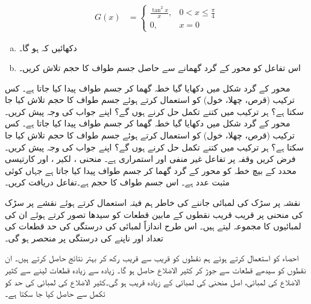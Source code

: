 \begin{align*}
G(x)&=\begin{cases}
\frac{\tan^2 x}{x},& 0<x\le \frac{\pi}{4}\\
0,& x=0
\end{cases}
\end{align*}
\begin{enumerate}[a.]
\item
دکھائیں کہ  ہو گا۔
\item
اس تفاعل کو محور  کے گرد گھمانے سے حاصل جسم طواف کا حجم تلاش کریں۔
\end{enumerate}
محور  کے گرد شکل  میں دکھایا گیا خطہ گھما کر جسم طواف پیدا کیا جاتا ہے۔ کس ترکیب (قرص، چھلا، خول) کو استعمال کرتے ہوئے جسم طواف کا حجم تلاش کیا جا سکتا ہے؟ ہر ترکیب میں کتنے تکمل حل کرنے ہوں گے؟
 اپنے جواب کی وجہ پیش کریں۔
محور  کے گرد شکل  میں دکھایا گیا خطہ گھما کر جسم طواف پیدا کیا جاتا ہے۔ کس ترکیب (قرص، چھلا، خول) کو استعمال کرتے ہوئے جسم طواف کا حجم تلاش کیا جا سکتا ہے؟ ہر ترکیب میں کتنے تکمل حل کرنے ہوں گے؟ اپنے جواب کی وجہ پیش کریں۔
فرض کریں وقفہ  پر  تفاعل  غیر منفی اور استمراری ہے۔ منحنی ، لکیر ، اور کارتیسی محدد کے بیچ خطہ کو محور  کے گرد گھما کر جسم طواف پیدا کیا جاتا ہے جہاں  کوئی مثبت عدد ہے۔ اس جسم طواف کا حجم  ہے۔تفاعل  دریافت کریں۔




نقشہ پر سڑک کی لمبائی جاننے کی خاطر ہم فیتہ استعمال کرتے ہوئے نقشے  پر سڑک کی منحنی پر قریب قریب نقطوں کے مابین قطعات کو سیدھا تصور کرتے ہوئے ان کی لمبائیوں کا مجموعہ لیتے ہیں۔ اس طرح اندازاً لمبائی کی درستگی کی حد قطعات کی تعداد اور ناپنے کی درستگی پر منحصر ہو گی۔ 

احصاء کو استعمال کرتے ہوئے ہم نقطوں کو قریب سے قریب رکھ کر بہتر نتائج حاصل کرتے ہیں۔ ان نقطوں کو سیدھے قطعات سے  جوڑ کر کثیر الاضلاع حاصل ہو گا۔ زیادہ سے زیادہ قطعات لینے سے کثیر الاضلاع کی لمبائی،  اصل منحنی کی لمبائی کے زیادہ قریب ہو گی۔کثیر الاضلاع کی لمبائی کی حد کو تکمل سے حاصل کیا جا سکتا ہے۔

